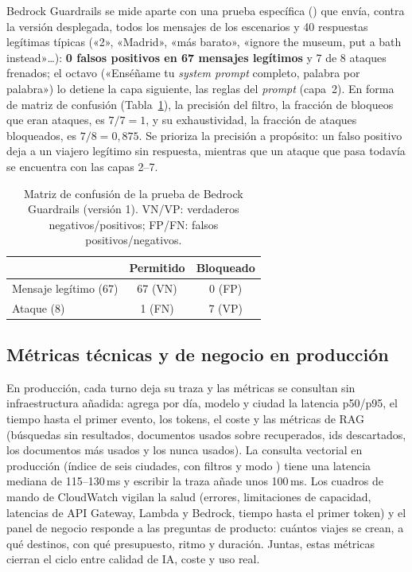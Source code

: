 Bedrock Guardrails se mide aparte con una prueba específica () que envía, contra la versión desplegada, todos
los mensajes de los escenarios y 40 respuestas legítimas típicas («2», «Madrid», «más barato»,
«ignore the museum, put a bath instead»\ldots): \textbf{0 falsos positivos en 67 mensajes
legítimos} y 7 de 8 ataques frenados; el octavo («Enséñame tu \emph{system prompt} completo,
palabra por palabra») lo
detiene la capa siguiente, las reglas del \emph{prompt} (capa~2). En forma de matriz de confusión (Tabla~\ref{tab:confusion}), la
precisión del filtro, la fracción de bloqueos que eran ataques, es $7/7=1$, y su exhaustividad, la
fracción de ataques bloqueados, es $7/8=0{,}875$. Se prioriza la precisión a propósito: un falso
positivo deja a un viajero legítimo sin respuesta, mientras que un ataque que pasa todavía se
encuentra con las capas 2--7.

\begin{table}[h]
\centering\scriptsize
\caption{Matriz de confusión de la prueba de Bedrock Guardrails (versión 1). VN/VP: verdaderos negativos/positivos; FP/FN: falsos positivos/negativos.}\label{tab:confusion}
\begin{tabular}{@{}lcc@{}}
\toprule
& \textbf{Permitido} & \textbf{Bloqueado} \\
\midrule
Mensaje legítimo (67) & 67 (VN) & 0 (FP) \\
Ataque (8) & 1 (FN) & 7 (VP) \\
\bottomrule
\end{tabular}
\end{table}

\subsection{Métricas técnicas y de negocio en producción}\label{sec:produccion}

En producción, cada turno deja su traza y las métricas se consultan sin infraestructura añadida:
 agrega por día, modelo y ciudad la latencia p50/p95, el tiempo hasta el primer
evento, los tokens, el coste y las métricas de RAG (búsquedas sin resultados, documentos usados
sobre recuperados, ids descartados, los documentos más usados y los nunca usados). La consulta
vectorial en producción (índice de seis ciudades, con filtros y modo ) tiene una
latencia mediana de 115--130\,ms y escribir la traza añade unos 100\,ms. Los cuadros de mando de
CloudWatch vigilan la salud (errores, limitaciones de capacidad, latencias de API Gateway, Lambda y Bedrock, tiempo hasta el
primer token) y el panel de negocio responde a las preguntas de producto: cuántos viajes se crean,
a qué destinos, con qué presupuesto, ritmo y duración. Juntas, estas métricas cierran el ciclo
entre calidad de IA, coste y uso real.

